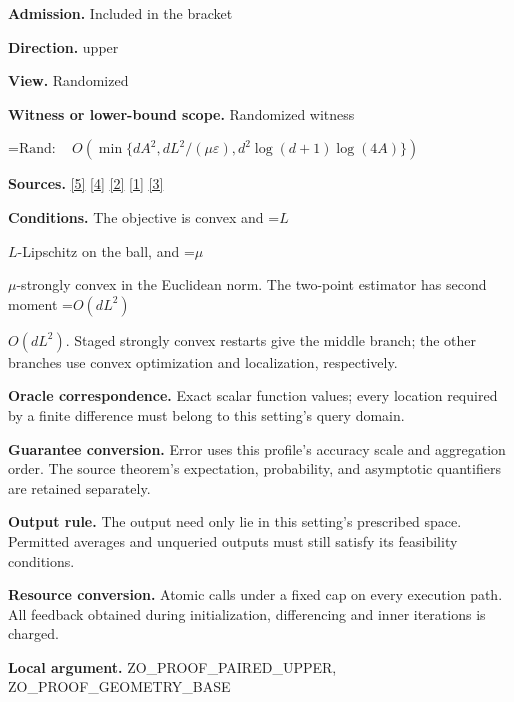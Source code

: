 \documentclass[10pt,a4paper]{article}
\newcommand{\AtlasMath}[1]{\par\begingroup\centering\setbox0=\hbox{$\displaystyle #1$}\ifdim\wd0>1.4\linewidth\typeout{ATLAS WIDE FORMULA: \the\wd0}\fi\ifdim\wd0>\linewidth\resizebox{\linewidth}{!}{\box0}\else\box0\fi\par\endgroup}
\newcommand{\AtlasInlineMath}[1]{\begingroup\setbox0=\hbox{$#1$}\ifdim\wd0>.4\linewidth\endgroup\AtlasMath{#1}\else\endgroup$#1$\fi}
\begin{document}
\textbf{Admission.} Included in the bracket



\textbf{Direction.} upper



\textbf{View.} Randomized



\textbf{Witness or lower-bound scope.} Randomized witness



\AtlasMath{\mathrm{Rand}:\quad O\!\left(\min\{dA^2,dL^2/(\mu\varepsilon),d^2\log(d+1)\log(4A)\}\right)}


\textbf{Sources.} \href{https://jmlr.org/papers/volume18/16-632/16-632.pdf}{[5]} \href{https://arxiv.org/pdf/1006.2425}{[4]} \href{https://www.mathnet.ru/php/archive.phtml?jrnid=mzm&option_lang=eng&paperid=1697&wshow=paper}{[2]} \href{https://arxiv.org/html/2610.00345v1}{[1]} \href{https://arxiv.org/html/2607.16558v2}{[3]}



\textbf{Conditions.} The objective is convex and \AtlasInlineMath{L}-Lipschitz on the ball, and \AtlasInlineMath{\mu}-strongly convex in the Euclidean norm. The two-point estimator has second moment \AtlasInlineMath{O(dL^2)}. Staged strongly convex restarts give the middle branch; the other branches use convex optimization and localization, respectively.



\textbf{Oracle correspondence.} Exact scalar function values; every location required by a finite difference must belong to this setting's query domain.



\textbf{Guarantee conversion.} Error uses this profile's accuracy scale and aggregation order. The source theorem's expectation, probability, and asymptotic quantifiers are retained separately.



\textbf{Output rule.} The output need only lie in this setting's prescribed space. Permitted averages and unqueried outputs must still satisfy its feasibility conditions.



\textbf{Resource conversion.} Atomic calls under a fixed cap on every execution path. All feedback obtained during initialization, differencing and inner iterations is charged.



\textbf{Local argument.} ZO\_PROOF\_PAIRED\_UPPER, ZO\_PROOF\_GEOMETRY\_BASE
\end{document}
